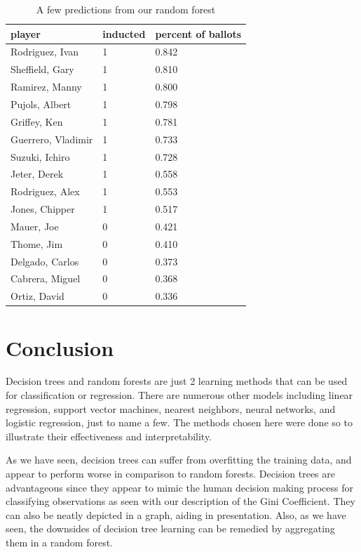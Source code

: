 \documentclass[preprint,12pt]{elsarticle}
\begin{document}
\begin{table}[h]
\centering
\begin{tabular}{|l |l |l|}
\hline
player & inducted & percent of ballots\\
\hline
Rodriguez, Ivan & 1 & 0.842 \\
Sheffield, Gary & 1 & 0.810 \\
Ramirez, Manny & 1 & 0.800 \\
Pujols, Albert & 1 & 0.798 \\ 
Griffey, Ken & 1 & 0.781 \\
Guerrero, Vladimir & 1 & 0.733 \\
Suzuki, Ichiro & 1 & 0.728 \\
Jeter, Derek & 1 & 0.558 \\
Rodriguez, Alex & 1 & 0.553 \\
Jones, Chipper & 1 & 0.517 \\
Mauer, Joe & 0 & 0.421 \\
Thome, Jim & 0 & 0.410 \\
Delgado, Carlos & 0 & 0.373 \\
Cabrera, Miguel & 0 & 0.368 \\
Ortiz, David & 0 & 0.336 \\
\hline
\end{tabular}
\caption{A few predictions from our random forest}
\label{rfplayers}
\end{table}


 


\section{Conclusion}
Decision trees and random forests are just 2 learning methods that can be used for classification or regression. There are numerous other models including linear regression, support vector machines, nearest neighbors, neural networks, and logistic regression, just to name a few. The methods chosen here were done so to illustrate their effectiveness and interpretability.

As we have seen, decision trees can suffer from overfitting the training data, and appear to perform worse in comparison to random forests. Decision trees are advantageous since they appear to mimic the human decision making process for classifying observations as seen with our description of the Gini Coefficient. They can also be neatly depicted in a graph, aiding in presentation. Also, as we have seen, the downsides of decision tree learning can be remedied by aggregating them in a random forest.
\end{document}
